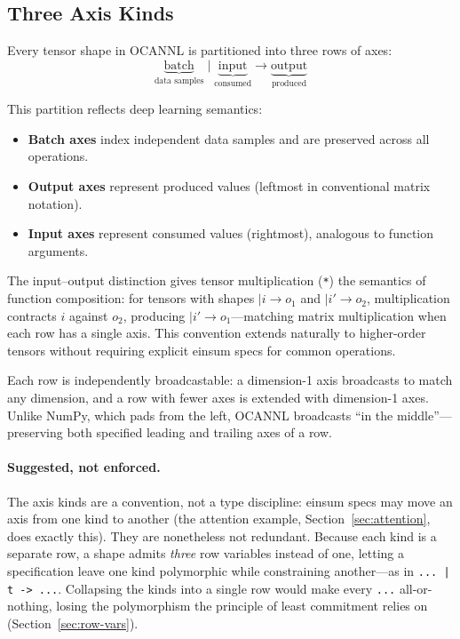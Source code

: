 \documentclass[acmsmall,nonacm,review]{acmart}
\newcommand{\code}[1]{\lstinline[basicstyle=\normalsize\ttfamily]{#1}}
\newcommand{\spec}[1]{\texttt{\small #1}}
\begin{document}
\subsection{Three Axis Kinds}
\label{sec:axis-kinds}

Every tensor shape in OCANNL is partitioned into three rows of axes:
\[
  \underbrace{\text{batch}}_{\text{data samples}} \;\big|\;
  \underbrace{\text{input}}_{\text{consumed}} \to
  \underbrace{\text{output}}_{\text{produced}}
\]

This partition reflects deep learning semantics:
\begin{itemize}
\item \textbf{Batch axes} index independent data samples and are preserved
  across all operations.
\item \textbf{Output axes} represent produced values (leftmost in
  conventional matrix notation).
\item \textbf{Input axes} represent consumed values (rightmost), analogous to
  function arguments.
\end{itemize}

The input--output distinction gives tensor multiplication (\code{*}) the
semantics of function composition: for tensors with shapes $|i \to o_1$ and
$|i' \to o_2$, multiplication contracts $i$ against $o_2$, producing
$|i' \to o_1$---matching matrix multiplication when each row has a single
axis. This convention extends naturally to higher-order tensors without
requiring explicit einsum specs for common operations.

Each row is independently broadcastable: a dimension-1 axis broadcasts to
match any dimension, and a row with fewer axes is extended with dimension-1
axes. Unlike NumPy, which pads from the left, OCANNL broadcasts ``in the
middle''---preserving both specified leading and trailing axes of a row.

\paragraph{Suggested, not enforced.}
The axis kinds are a convention, not a type discipline: einsum specs may move
an axis from one kind to another (the attention example,
Section~\ref{sec:attention}, does exactly this). They are nonetheless not
redundant. Because each kind is a separate row, a shape admits \emph{three}
row variables instead of one, letting a specification leave one kind
polymorphic while constraining another---as in \spec{... | t -> ...}.
Collapsing the kinds into a single row would make every \spec{...}
all-or-nothing, losing the polymorphism the principle of least commitment
relies on (Section~\ref{sec:row-vars}).
\end{document}

